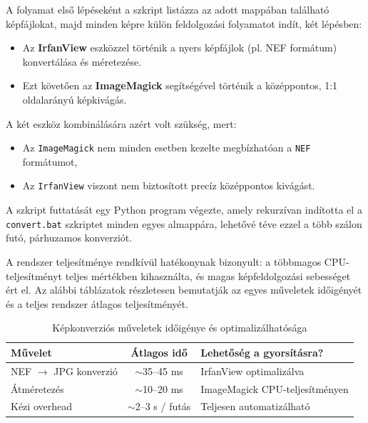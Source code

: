             A folyamat első lépéseként a szkript listázza az adott mappában található képfájlokat, majd minden képre külön feldolgozási folyamatot indít, két lépésben:
            
            \begin{itemize}
            \item Az \textbf{IrfanView} eszközzel történik a nyers képfájlok (pl. NEF formátum) konvertálása és méretezése.
            \item Ezt követően az \textbf{ImageMagick} segítségével történik a középpontos, 1:1 oldalarányú képkivágás.
            \end{itemize}
            
            A két eszköz kombinálására azért volt szükség, mert:
            \begin{itemize}
            \item Az \texttt{ImageMagick} nem minden esetben kezelte megbízhatóan a \texttt{NEF} formátumot,
            \item Az \texttt{IrfanView} viszont nem biztosított precíz középpontos kivágást.
            \end{itemize}
            
            A szkript futtatását egy Python program végezte, amely rekurzívan indította el a \texttt{convert.bat} szkriptet minden egyes almappára, lehetővé téve ezzel a több szálon futó, párhuzamos konverziót.
            
            A rendszer teljesítménye rendkívül hatékonynak bizonyult: a többmagos CPU-teljesítményt teljes mértékben kihasználta, és magas képfeldolgozási sebességet ért el. Az alábbi táblázatok részletesen bemutatják az egyes műveletek időigényét és a teljes rendszer átlagos teljesítményét.
            
            \vspace{1em}
            \begin{table}[H]
            \centering
            \caption{Képkonverziós műveletek időigénye és optimalizálhatósága}
            \begin{tabular}{|l|c|l|}
            \hline
            \textbf{Művelet} & \textbf{Átlagos idő} & \textbf{Lehetőség a gyorsításra?} \\
            \hline
            NEF $\rightarrow$ JPG konverzió & $\sim$35–45 ms & IrfanView optimalizálva \\
            Átméretezés & $\sim$10–20 ms & ImageMagick CPU-teljesítményen \\
            Kézi overhead & $\sim$2–3 s / futás & Teljesen automatizálható \\
            \hline
            \end{tabular}
            \end{table}
            
